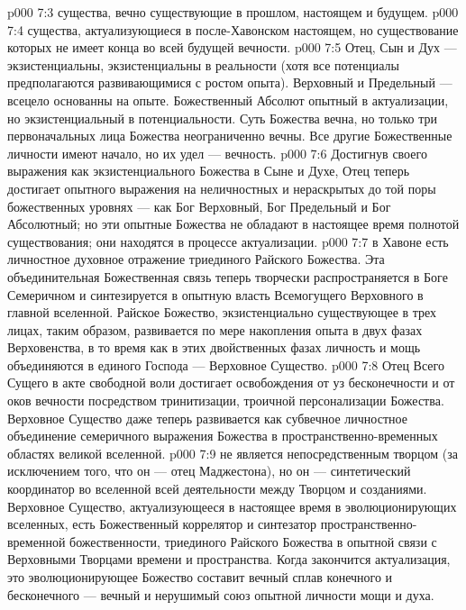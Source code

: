 \vs p000 7:3 \bibnobreakspace {} существа, вечно существующие в прошлом, настоящем и будущем.
\vs p000 7:4 \bibnobreakspace {} существа, актуализующиеся в после\hyp{}Хавонском настоящем, но существование которых не имеет конца во всей будущей вечности.
\vs p000 7:5 \pc Отец, Сын и Дух --- экзистенциальны, экзистенциальны в реальности (хотя все потенциалы предполагаются развивающимися с ростом опыта). Верховный и Предельный --- всецело основанны на опыте. Божественный Абсолют опытный в актуализации, но экзистенциальный в потенциальности. Суть Божества вечна, но только три первоначальных лица Божества неограниченно вечны. Все другие Божественные личности имеют начало, но их удел --- вечность.
\vs p000 7:6 Достигнув своего выражения как экзистенциального Божества в Сыне и Духе, Отец теперь достигает опытного выражения на неличностных и нераскрытых до той поры божественных уровнях --- как Бог Верховный, Бог Предельный и Бог Абсолютный; но эти опытные Божества не обладают в настоящее время полнотой существования; они находятся в процессе актуализации.
\vs p000 7:7 \pc {} в Хавоне есть личностное духовное отражение триединого Райского Божества. Эта объединительная Божественная связь теперь творчески распространяется в Боге Семеричном и синтезируется в опытную власть Всемогущего Верховного в главной вселенной. Райское Божество, экзистенциально существующее в трех лицах, таким образом, развивается по мере накопления опыта в двух фазах Верховенства, в то время как в этих двойственных фазах личность и мощь объединяются в единого Господа --- Верховное Существо.
\vs p000 7:8 Отец Всего Сущего в акте свободной воли достигает освобождения от уз бесконечности и от оков вечности посредством тринитизации, троичной персонализации Божества. Верховное Существо даже теперь развивается как субвечное личностное объединение семеричного выражения Божества в пространственно\hyp{}временных областях великой вселенной.
\vs p000 7:9 \pc {} не является непосредственным творцом (за исключением того, что он --- отец Маджестона), но он --- синтетический координатор во вселенной всей деятельности между Творцом и созданиями. Верховное Существо, актуализующееся в настоящее время в эволюционирующих вселенных, есть Божественный коррелятор и синтезатор пространственно\hyp{}временной божественности, триединого Райского Божества в опытной связи с Верховными Творцами времени и пространства. Когда закончится актуализация, это эволюционирующее Божество составит вечный сплав конечного и бесконечного --- вечный и нерушимый союз опытной личности мощи и духа.
